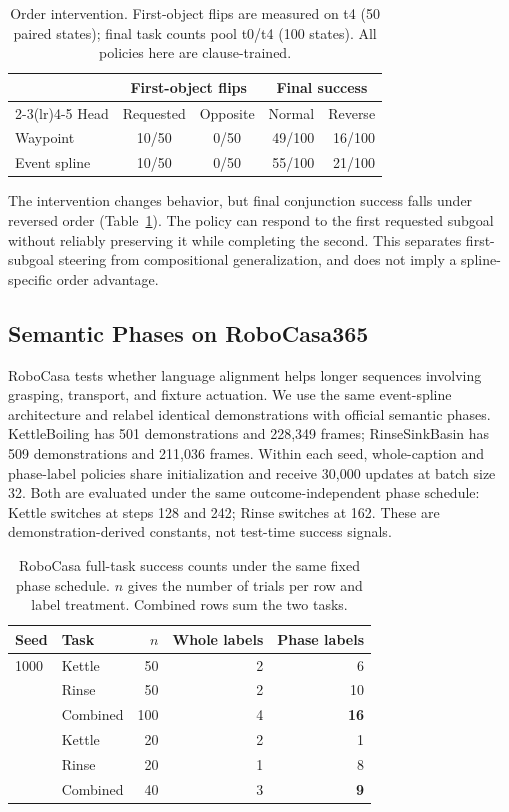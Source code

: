 \begin{table}[t]
\centering
\caption{Order intervention. First-object flips are measured on t4 (50 paired states); final task counts pool t0/t4 (100 states). All policies here are clause-trained.}
\label{tab:order}
\setlength{\tabcolsep}{4pt}
\begin{tabular}{lccrr}
\toprule
 & \multicolumn{2}{c}{First-object flips} & \multicolumn{2}{c}{Final success} \\
\cmidrule(lr){2-3}\cmidrule(lr){4-5}
Head & Requested & Opposite & Normal & Reverse \\
\midrule
Waypoint & 10/50 & 0/50 & 49/100 & 16/100 \\
Event spline & 10/50 & 0/50 & 55/100 & 21/100 \\
\bottomrule
\end{tabular}
\end{table}

The intervention changes behavior, but final conjunction success falls under reversed order (Table~\ref{tab:order}). The policy can respond to the first requested subgoal without reliably preserving it while completing the second. This separates first-subgoal steering from compositional generalization, and does not imply a spline-specific order advantage.

\subsection{Semantic Phases on RoboCasa365}

RoboCasa tests whether language alignment helps longer sequences involving grasping, transport, and fixture actuation. We use the same event-spline architecture and relabel identical demonstrations with official semantic phases. KettleBoiling has 501 demonstrations and 228,349 frames; RinseSinkBasin has 509 demonstrations and 211,036 frames. Within each seed, whole-caption and phase-label policies share initialization and receive 30,000 updates at batch size 32. Both are evaluated under the same outcome-independent phase schedule: Kettle switches at steps 128 and 242; Rinse switches at 162. These are demonstration-derived constants, not test-time success signals.

\begin{table}[t]
\centering
\caption{RoboCasa full-task success counts under the same fixed phase schedule. $n$ gives the number of trials per row and label treatment. Combined rows sum the two tasks.}
\label{tab:robocasa}
\setlength{\tabcolsep}{4.5pt}
\begin{tabular}{llrrr}
\toprule
Seed & Task & $n$ & Whole labels & Phase labels \\
\midrule
1000 & Kettle & 50 & 2 & 6 \\
 & Rinse & 50 & 2 & 10 \\
 & Combined & 100 & 4 & \textbf{16} \\
\addlinespace
1001 & Kettle & 20 & 2 & 1 \\
 & Rinse & 20 & 1 & 8 \\
 & Combined & 40 & 3 & \textbf{9} \\
\bottomrule
\end{tabular}
\end{table}


